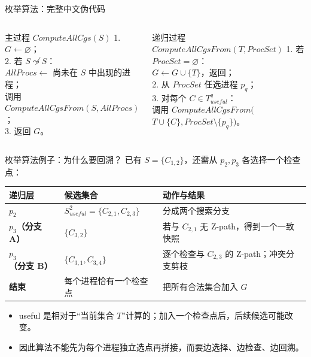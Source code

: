 \documentclass[UTF8,fontset=none,aspectratio=169,10pt]{beamer}
\begin{document}
\begin{frame}{枚举算法：完整中文伪代码}
\scriptsize
\begin{columns}[T,onlytextwidth]
\begin{block}{主过程 $ComputeAllCgs(S)$}
1. $G\leftarrow\varnothing$；\\
2. 若 $S\not\leadsto S$：\\
\quad $AllProcs\leftarrow$ 尚未在 $S$ 中出现的进程；\\
\quad 调用 $ComputeAllCgsFrom(S,AllProcs)$；\\
3. 返回 $G$。
\end{block}
\begin{block}{递归过程 $ComputeAllCgsFrom(T,ProcSet)$}
1. 若 $ProcSet=\varnothing$：\\
\quad $G\leftarrow G\cup\{T\}$，返回；\\
2. 从 $ProcSet$ 任选进程 $p_q$；\\
3. 对每个 $C\in T_{useful}^{q}$：\\
\quad 调用 $ComputeAllCgsFrom($\\
\qquad $T\cup\{C\},ProcSet\setminus\{p_q\})$。
\end{block}
\end{columns}
\normalsize
\vfill
{}
\end{frame}

\begin{frame}{枚举算法例子：为什么要回溯？}
\small
已有 $S=\{C_{1,2}\}$，还需从 $p_2,p_3$ 各选择一个检查点：
\begin{center}
\begin{tabularx}{.94\linewidth}{>{\bfseries}p{2.2cm}X X}
\toprule
递归层 & 候选集合 & 动作与结果 \\
\midrule
$p_2$ & $S_{useful}^{2}=\{C_{2,1},C_{2,3}\}$ & 分成两个搜索分支 \\
$p_3$（分支 A） & $\{C_{3,2}\}$ & 若与 $C_{2,1}$ 无 Z-path，得到一个一致快照 \\
$p_3$（分支 B） & $\{C_{3,1},C_{3,4}\}$ & 逐个检查与 $C_{2,3}$ 的 Z-path；冲突分支剪枝 \\
结束 & 每个进程恰有一个检查点 & 把所有合法集合加入 $G$ \\
\bottomrule
\end{tabularx}
\end{center}
\begin{itemize}
  \item useful 是相对于“当前集合 $T$”计算的；加入一个检查点后，后续候选可能改变。
  \item 因此算法不能先为每个进程独立选点再拼接，而要边选择、边检查、边回溯。
\end{itemize}
\end{frame}
\end{document}
